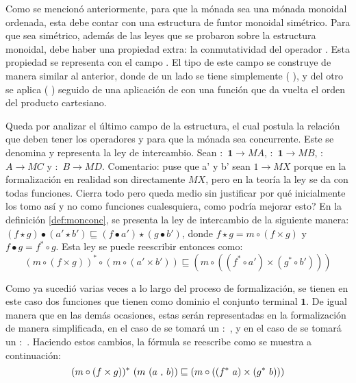 Como se mencionó anteriormente, para que la mónada sea una mónada monoidal ordenada, esta debe contar con una estructura de funtor monoidal simétrico. Para que sea simétrico, además de las leyes que se probaron sobre la estructura monoidal, debe haber una propiedad extra: la conmutatividad del operador . Esta propiedad se representa con el campo . El tipo de este campo se construye de manera similar al anterior, donde de un lado se tiene simplemente ( ), y del otro se aplica ( ) seguido de una aplicación de \AgdaField{$\gg=$} con una función que da vuelta el orden del producto cartesiano. 

Queda por analizar el último campo de la estructura, el cual postula la relación que deben tener los operadores \AgdaField{$\gg=$} y  para que la mónada sea concurrente. Este se denomina  y representa la ley de intercambio. Sean  $:$ $\mathbf{1} \rightarrow \mathit{M} A$,  $:$ $\mathbf{1} \rightarrow \mathit{M} B$,  $:$ $A \rightarrow \mathit{M} C$ y  $:$ $B \rightarrow \mathit{M} D$. {\color{red} Comentario: puse que a' y b' sean $1 \rightarrow M X$ porque en la formalización en realidad son directamente $M X$, pero en la teoría la ley se da con todas funciones. Cierra todo pero queda medio sin justificar por qué inicialmente los tomo así y no como funciones cualesquiera, como podría mejorar esto?} En la definición \ref{def:monconc}, se presenta la ley de intercambio de la siguiente manera: $(f \star g) \bullet (a' \star b') \sqsubseteq (f \bullet a') \star (g \bullet b')$, donde $f \star g = m \circ (f \times g)$ y $f \bullet g = f^* \circ g$. Esta ley se puede reescribir entonces como:
\begin{equation*}
(m \circ (f \times g))^* \circ (m \circ (a' \times b')) \sqsubseteq (m \circ ((f^* \circ a') \times (g^* \circ b')))
\end{equation*}

Como ya sucedió varias veces a lo largo del proceso de formalización, se tienen en este caso dos funciones que tienen como dominio el conjunto terminal $\mathbf{1}$. De igual manera que en las demás ocasiones, estas serán representadas en la formalización de manera simplificada, en el caso de  se tomará un  $:$ , y en el caso de  se tomará un  $:$ . Haciendo estos cambios, la fórmula se reescribe como se muestra a continuación:
\begin{equation*}
(m \circ (f \times g))^* \ (m\ (a\  \AgdaInductiveConstructor{,}\ b)) \sqsubseteq (m \circ ((f^*\ a) \times (g^*\ b)))
\end{equation*}

